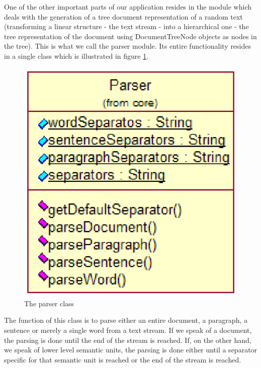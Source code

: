 One of the other important parts of our application resides in the module which deals with
the generation of a tree document representation of a random text (transforming a linear
structure - the text stream - into a hierarchical one - the tree representation of the
document using DocumentTreeNode objects as nodes in the tree). This is what we call
the parser module. Its entire functionality resides in a single class which is illustrated
in figure \ref{fig:parseruml}.

\begin{figure}[htb]
\begin{center}
\includegraphics{img/ParserUML.eps}
\end{center}
\caption{The parser class}
\label{fig:parseruml}
\end{figure}

The function of this class is to parse either an entire document, a paragraph, a sentence
or merely a single word from a text stream. If we speak of a document, the parsing is done
until the end of the stream is reached. If, on the other hand, we speak of lower level
semantic units, the parsing is done either until a separator specific for that semantic
unit is reached or the end of the stream is reached.

